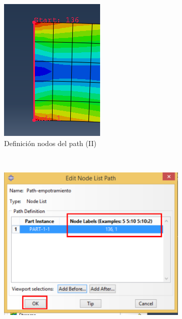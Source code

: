 \begin{enumerate}
\begin{figure}[H]
\begin{subfigure}{0.30\textwidth}
     \includegraphics[width=\textwidth]{./body/images/imagen102}
     \caption{Definición nodos del path (II)}
     \label{figu102}
   \end{subfigure}%
   ~ %
   \begin{subfigure}{0.39\textwidth}
     \includegraphics[width=\textwidth]{./body/images/imagen103.pdf}

\end{subfigure}
\end{figure}
\end{enumerate}

